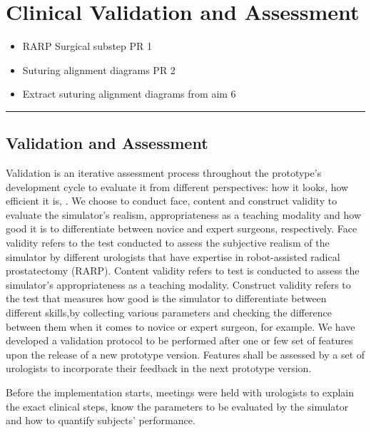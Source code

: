 
\section{Clinical Validation and Assessment}\label{sec:clinical_validation}

\begin{itemize}
  \item RARP Surgical substep PR 1 
  \item Suturing alignment diagrams PR 2 
  \item Extract suturing alignment diagrams from aim 6 
\end{itemize}

\hrule%

\subsection{Validation and Assessment}\label{ssec:validation_assessment}


Validation is an iterative assessment process throughout the prototype's development cycle to evaluate it from different perspectives: how it looks, how efficient it is, \etc. We choose to conduct face, content and construct validity to evaluate the simulator's realism, appropriateness as a teaching modality and how good it is to differentiate between novice and expert surgeons, respectively.
Face validity refers to the test conducted to assess the subjective realism of the simulator by different urologists that have expertise in robot-assisted radical prostatectomy (RARP). Content validity refers to test is conducted to assess the simulator’s appropriateness as a teaching modality. Construct validity refers to the test that measures how good is the simulator to differentiate between different skills,by collecting various parameters and checking the difference between them when it comes to novice or expert surgeon, for example.
We have developed a validation protocol to be performed after one or few set of features upon the release of a new prototype version. Features shall be assessed by a set of urologists to incorporate their feedback in the next prototype version.

Before the implementation starts, meetings were held with urologists to explain the exact clinical steps, know the parameters to be evaluated by the simulator and how to quantify subjects' performance.

